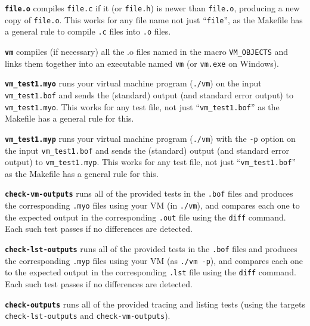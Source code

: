 \documentclass[11pt,letterpaper]{article}
\begin{document}
\newcommand{\bft}[1]{\textbf{\texttt{#1}}}
\begin{description}
\item{\bft{file.o}} compiles \texttt{file.c} if it (or \texttt{file.h}) is
  newer than \texttt{file.o}, producing a new copy of \texttt{file.o}.
  This works for any file name not just ``\texttt{file}'', as the
  Makefile has a general rule to compile \texttt{.c} files into
  \texttt{.o} files.

\item{\bft{vm}} compiles (if necessary) all the .o files named in the macro
  \texttt{VM\_OBJECTS} and links them together into an executable
  named \texttt{vm} (or \texttt{vm.exe} on Windows).

\item{\bft{vm\_test1.myo}} runs your virtual machine program (\texttt{./vm})
  on the input \texttt{vm\_test1.bof} and sends the (standard) output
  (and standard error output) to \texttt{vm\_test1.myo}.
  This works for any test file, not just ``\texttt{vm\_test1.bof}'' as
  the Makefile has a general rule for this.

\item{\bft{vm\_test1.myp}} runs your virtual machine program (\texttt{./vm})
  with the \texttt{-p} option on the input \texttt{vm\_test1.bof}
  and sends the (standard) output
  (and standard error output) to \texttt{vm\_test1.myp}.
  This works for any test file, not just ``\texttt{vm\_test1.bof}'' as
  the Makefile has a general rule for this.

\item{\bft{check-vm-outputs}} runs all of the provided tests in the
  \texttt{.bof} files and produces the corresponding \texttt{.myo}
  files using your VM (in \texttt{./vm}), and compares each one to the
  expected output in the corresponding \texttt{.out} file using the
  \texttt{diff} command. Each such test passes if no differences are detected.

\item{\bft{check-lst-outputs}} runs all of the provided tests in the
  \texttt{.bof} files and produces the corresponding \texttt{.myp}
  files using your VM (as \texttt{./vm -p}), and compares each one to the
  expected output in the corresponding \texttt{.lst} file using the
  \texttt{diff} command. Each such test passes if no differences are detected.

\item{\bft{check-outputs}} runs all of the provided tracing and listing
  tests (using the targets
  \texttt{check-lst-outputs} and \texttt{check-vm-outputs}).


\end{description}
\end{document}
